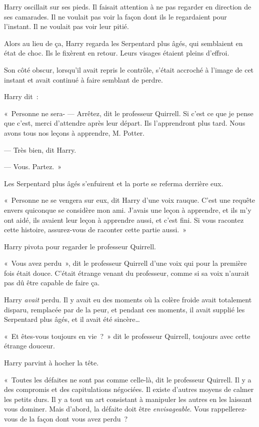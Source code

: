 Harry oscillait sur ses pieds. Il faisait attention à ne pas regarder en direction de ses camarades. Il ne voulait pas voir la façon dont ils le regardaient pour l'instant. Il ne voulait pas voir leur pitié.

Alors au lieu de ça, Harry regarda les Serpentard plus âgés, qui semblaient en état de choc. Ils le fixèrent en retour. Leurs visages étaient pleins d'effroi.

Son côté obscur, lorsqu'il avait repris le contrôle, s'était accroché à l'image de cet instant et avait continué à faire semblant de perdre.

Harry dit~:

«~Personne ne sera-
--- Arrêtez, dit le professeur Quirrell. Si c'est ce que je pense que c'est, merci d'attendre après leur départ. Ils l'apprendront plus tard. Nous avons tous nos leçons à apprendre, M. Potter.

--- Très bien, dit Harry.

--- Vous. Partez.~»

Les Serpentard plus âgés s'enfuirent et la porte se referma derrière eux.

«~Personne ne se vengera sur eux, dit Harry d'une voix rauque. C'est une requête envers quiconque se considère mon ami. J'avais une leçon à apprendre, et ils m'y ont aidé, ils avaient leur leçon à apprendre aussi, et c'est fini. Si vous racontez cette histoire, assurez-vous de raconter cette partie aussi.~»

Harry pivota pour regarder le professeur Quirrell.

«~Vous avez perdu~», dit le professeur Quirrell d'une voix qui pour la première fois était douce. C'était étrange venant du professeur, comme si sa voix n'aurait pas dû être capable de faire ça.

Harry \emph{avait} perdu. Il y avait eu des moments où la colère froide avait totalement disparu, remplacée par de la peur, et pendant ces moments, il avait supplié les Serpentard plus âgés, et il avait été sincère…

«~Et êtes-vous toujours en vie~?~» dit le professeur Quirrell, toujours avec cette étrange douceur.

Harry parvint à hocher la tête.

«~Toutes les défaites ne sont pas comme celle-là, dit le professeur Quirrell. Il y a des compromis et des capitulations négociées. Il existe d'autres moyens de calmer les petits durs. Il y a tout un art consistant à manipuler les autres en les laissant vous dominer. Mais d'abord, la défaite doit être \emph{envisageable}. Vous rappellerez-vous de la façon dont vous avez perdu~?

